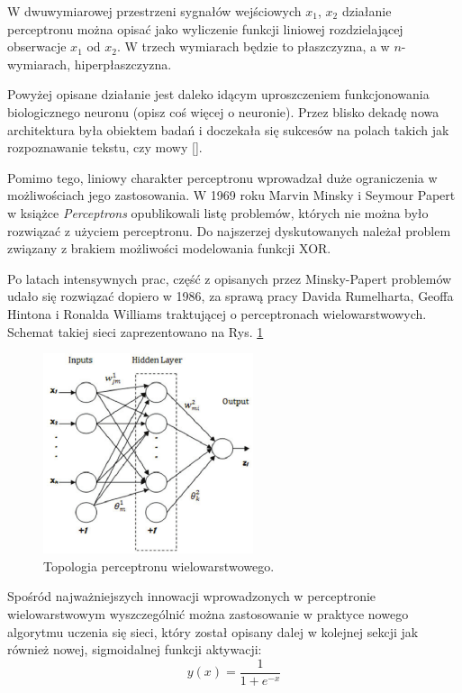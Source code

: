 W dwuwymiarowej przestrzeni sygnałów wejściowych {$x_1$, $x_2$}  działanie perceptronu można opisać jako wyliczenie funkcji liniowej rozdzielającej obserwacje $x_1$ od $x_2$. W trzech wymiarach będzie to płaszczyzna, a w $n$-wymiarach, hiperpłaszczyzna.

Powyżej opisane działanie jest daleko idącym uproszczeniem funkcjonowania biologicznego neuronu (opisz coś więcej o neuronie). Przez blisko dekadę nowa architektura była obiektem badań i doczekała się sukcesów na polach takich jak rozpoznawanie tekstu, czy mowy []. 

Pomimo tego, liniowy charakter perceptronu wprowadzał duże ograniczenia w możliwościach jego zastosowania. W 1969 roku Marvin Minsky i Seymour Papert w książce \textit{Perceptrons} opublikowali listę problemów, których nie można było rozwiązać z użyciem perceptronu. Do najszerzej dyskutowanych należał problem związany z brakiem możliwości modelowania funkcji XOR.

Po latach intensywnych prac, część z opisanych przez Minsky-Papert problemów udało się rozwiązać dopiero w 1986, za sprawą pracy Davida Rumelharta, Geoffa Hintona i Ronalda Williams traktującej o perceptronach wielowarstwowych. Schemat takiej sieci zaprezentowano na Rys. \ref{MLperceptron}
\begin{figure}[h!]
	\centering
	\includegraphics[width=0.55\textwidth]{figures/MLperceptron.png}
	\caption{Topologia perceptronu wielowarstwowego.}
	\label{MLperceptron}
\end{figure}

Spośród najważniejszych innowacji wprowadzonych w perceptronie wielowarstwowym wyszczególnić można zastosowanie w praktyce nowego algorytmu uczenia się sieci, który został opisany dalej w kolejnej sekcji jak również nowej, sigmoidalnej funkcji aktywacji:
\begin{equation}
\label{eqSigActFunc}
y(x) = \frac{1}{1 + e^{-x}}
\end{equation}

